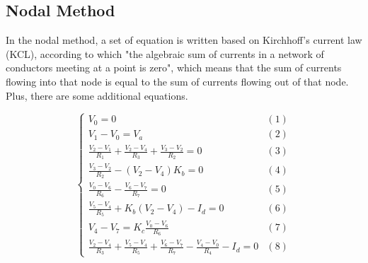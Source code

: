 


\subsection{Nodal Method}
\par
In the nodal method, a set of equation is written based on Kirchhoff's current law (KCL), according to which "the algebraic sum of currents in a network of conductors meeting at a point is zero", which means that the sum of currents flowing into that node is equal to the sum of currents flowing out of that node. Plus, there are some additional equations.


\begin{equation}
\begin{cases}
V_0 = 0 & \mbox{$(1)$} \\
V_1-V_0 = V_a & \mbox{$(2)$}  \\
\frac{V_2-V_1}{R_1} + \frac{V_2-V_4}{R_3} + \frac{V_3-V_2}{R_2} = 0 & \mbox{$(3)$} \\
\frac{V_3-V_2}{R_2} - (V_2-V_4) K_b = 0 & \mbox{$(4)$} \\
\frac{V_0-V_6}{R_6} - \frac{V_6-V_7}{R_7} = 0 & \mbox{$(5)$}\\
\frac{V_5-V_4}{R_5} + K_b (V_2 - V_4) - I_d = 0 & \mbox{$(6)$}\\
V_4-V_7 = K_c \frac{V_0-V_6}{R_6} & \mbox{$(7)$} \\
\frac{V_2-V_4}{R_3} + \frac{V_5-V_4}{R_5} +  \frac{V_6-V_7}{R_7} - \frac{V_4-V_0}{R_4} - I_d = 0 & \mbox{$(8)$}
\end{cases}
\end{equation}

